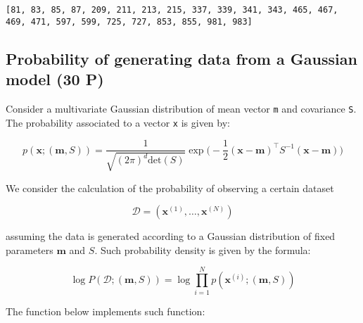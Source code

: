 \documentclass[11pt]{article}
\begin{document}
    \begin{Verbatim}[commandchars=\\\{\}]
[81, 83, 85, 87, 209, 211, 213, 215, 337, 339, 341, 343, 465, 467, 469, 471, 597, 599, 725, 727, 853, 855, 981, 983]

    \end{Verbatim}

    \subsection{Probability of generating data from a Gaussian model (30
P)}\label{probability-of-generating-data-from-a-gaussian-model-30-p}

Consider a multivariate Gaussian distribution of mean vector \texttt{m}
and covariance \texttt{S}. The probability associated to a vector
\texttt{x} is given by:

\[
p(\boldsymbol{x};(\boldsymbol{m},S)) = \frac{1}{\sqrt{(2\pi)^d \mathrm{det}(S)}} \exp \Big( - \frac12 (\boldsymbol{x}-\boldsymbol{m})^\top S^{-1} (\boldsymbol{x}-\boldsymbol{m})\Big)
\]

We consider the calculation of the probability of observing a certain
dataset

\[
\mathcal{D} = (\boldsymbol{x}^{(1)},\dots,\boldsymbol{x}^{(N)})
\]

assuming the data is generated according to a Gaussian distribution of
fixed parameters \(\boldsymbol{m}\) and \(S\). Such probability density
is given by the formula:

\[
\log P(\mathcal{D};(\boldsymbol{m},S)) = \log \prod_{i=1}^N p(\boldsymbol{x}^{(i)};(\boldsymbol{m},S))
\]

The function below implements such function:
\end{document}
